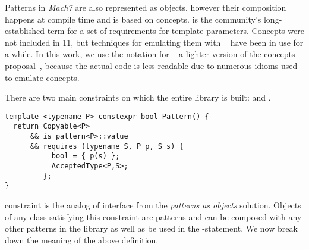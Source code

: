 Patterns in \emph{Mach7} are also represented as objects, however their 
composition happens at compile time and is based on \Cpp{} concepts. 
 is the \Cpp{} community's long-established term for a set of 
requirements for template parameters. Concepts were not included in \Cpp{}11, 
but techniques for emulating them with 
~\cite{jarvi:03:cuj_arbitrary_overloading} have been in use for 
a while. In this work, we use the notation for  -- a 
lighter version of the concepts proposal~\cite{N3580}, because the actual code 
is less readable due to numerous idioms used to emulate concepts.

There are two main constraints on which the entire library is built: 
 and .

\begin{lstlisting}
template <typename P> constexpr bool Pattern() {
  return Copyable<P>
      && is_pattern<P>::value
      && requires (typename S, P p, S s) {
           bool = { p(s) };
           AcceptedType<P,S>;
         };
}
\end{lstlisting}


\noindent
{} constraint is the analog of  interface from the 
\emph{patterns as objects} solution. Objects of any class  satisfying 
this constraint are patterns and can be composed with any other patterns in the 
library as well as be used in the -statement. We now break down the 
meaning of the above definition.

